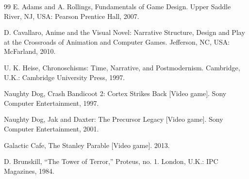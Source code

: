 \begin{thebibliography}{99}
E. Adams and A. Rollings, Fundamentals of Game Design. Upper Saddle River, NJ, USA: Pearson Prentice Hall, 2007.

D. Cavallaro, Anime and the Visual Novel: Narrative Structure, Design and Play at the Crossroads of Animation and Computer Games. Jefferson, NC, USA: McFarland, 2010.

U. K. Heise, Chronoschisms: Time, Narrative, and Postmodernism. Cambridge, U.K.: Cambridge University Press, 1997.

Naughty Dog, Crash Bandicoot 2: Cortex Strikes Back [Video game]. Sony Computer Entertainment, 1997.

Naughty Dog, Jak and Daxter: The Precursor Legacy [Video game]. Sony Computer Entertainment, 2001.

Galactic Cafe, The Stanley Parable [Video game]. 2013.

D. Brunskill, “The Tower of Terror,” Proteus, no. 1. London, U.K.: IPC Magazines, 1984.
\end{thebibliography}


